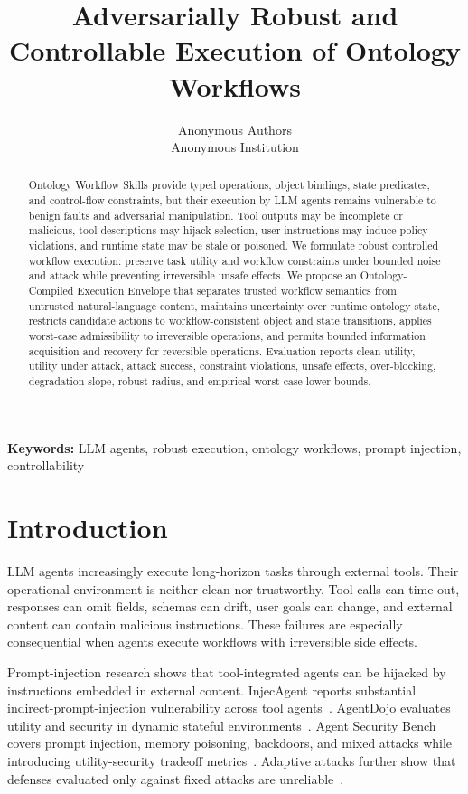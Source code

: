 \documentclass[10pt,twocolumn]{article}
\title{Adversarially Robust and Controllable Execution of Ontology Workflows}
\author{Anonymous Authors\\Anonymous Institution}
\providecommand{\keywords}[1]{\par\smallskip\noindent\textbf{Keywords: }#1\par}
\begin{document}
\maketitle

\begin{abstract}
Ontology Workflow Skills provide typed operations, object bindings, state predicates, and control-flow constraints, but their execution by LLM agents remains vulnerable to benign faults and adversarial manipulation. Tool outputs may be incomplete or malicious, tool descriptions may hijack selection, user instructions may induce policy violations, and runtime state may be stale or poisoned. We formulate robust controlled workflow execution: preserve task utility and workflow constraints under bounded noise and attack while preventing irreversible unsafe effects. We propose an Ontology-Compiled Execution Envelope that separates trusted workflow semantics from untrusted natural-language content, maintains uncertainty over runtime ontology state, restricts candidate actions to workflow-consistent object and state transitions, applies worst-case admissibility to irreversible operations, and permits bounded information acquisition and recovery for reversible operations. Evaluation reports clean utility, utility under attack, attack success, constraint violations, unsafe effects, over-blocking, degradation slope, robust radius, and empirical worst-case lower bounds.
\end{abstract}

\keywords{LLM agents, robust execution, ontology workflows, prompt injection, controllability}

\section{Introduction}
LLM agents increasingly execute long-horizon tasks through external tools. Their operational environment is neither clean nor trustworthy. Tool calls can time out, responses can omit fields, schemas can drift, user goals can change, and external content can contain malicious instructions. These failures are especially consequential when agents execute workflows with irreversible side effects.

Prompt-injection research shows that tool-integrated agents can be hijacked by instructions embedded in external content. InjecAgent reports substantial indirect-prompt-injection vulnerability across tool agents~\cite{zhan2024injecagent}. AgentDojo evaluates utility and security in dynamic stateful environments~\cite{debenedetti2024agentdojo}. Agent Security Bench covers prompt injection, memory poisoning, backdoors, and mixed attacks while introducing utility-security tradeoff metrics~\cite{zhang2024asb}. Adaptive attacks further show that defenses evaluated only against fixed attacks are unreliable~\cite{zhan2025adaptive}.
\end{document}
